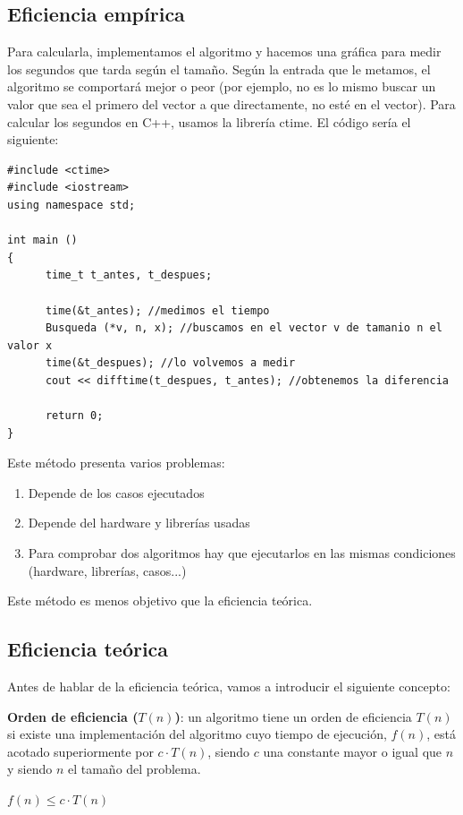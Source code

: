 \documentclass[10pt,a4paper,spanish]{report}
\begin{document}
\subsection{\textcolor[rgb]{0.1,0.2,0.6}Eficiencia empírica}
\noindent
Para calcularla, implementamos el algoritmo y hacemos una gráfica para medir los segundos que tarda según el tamaño. Según la entrada que le metamos, el algoritmo se comportará mejor o peor (por ejemplo, no es lo mismo buscar un valor que sea el primero del vector a que directamente, no esté en el vector).
\newpage
\noindent
Para calcular los segundos en C++, usamos la librería ctime. El código sería el siguiente:
\begin{verbatim}
#include <ctime>
#include <iostream>
using namespace std;

int main ()
{
      time_t t_antes, t_despues;

      time(&t_antes); //medimos el tiempo
      Busqueda (*v, n, x); //buscamos en el vector v de tamanio n el valor x
      time(&t_despues); //lo volvemos a medir
      cout << difftime(t_despues, t_antes); //obtenemos la diferencia

      return 0;
}
\end{verbatim}
\noindent
Este método presenta varios problemas:
\begin{enumerate}[1.]
\item Depende de los casos ejecutados
\item Depende del hardware y librerías usadas
\item Para comprobar dos algoritmos hay que ejecutarlos en las mismas condiciones (hardware, librerías, casos...)
\end{enumerate}

\noindent
Este método es menos objetivo que la eficiencia teórica.

\subsection{\textcolor[rgb]{0.1,0.2,0.6}Eficiencia teórica}
\noindent
Antes de hablar de la eficiencia teórica, vamos a introducir el siguiente concepto:

\noindent
\textbf{Orden de eficiencia ($T(n)$)}: un algoritmo tiene un orden de eficiencia $T(n)$ si existe una implementación del algoritmo cuyo tiempo de ejecución, $f(n)$, está acotado superiormente por $c \cdot T(n)$, siendo $c$ una constante mayor o igual que $n$ y siendo $n$ el tamaño del problema.

\begin{center}
\begin{math}
f(n) \leq c \cdot T(n)
\end{math}
\end{center}
\end{document}
